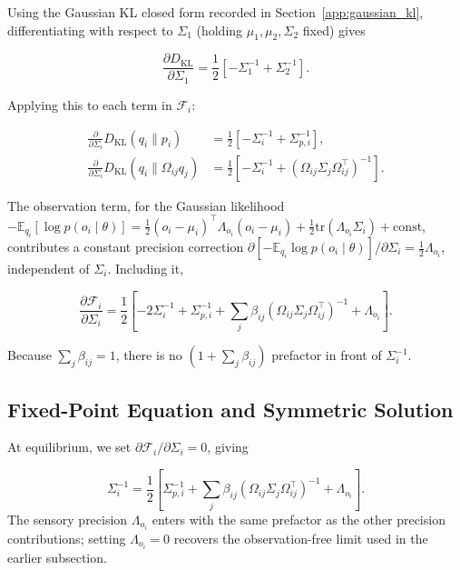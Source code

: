 \documentclass[11pt]{article}
\begin{document}
Using the Gaussian KL closed form recorded in Section~\ref{app:gaussian_kl}, differentiating with respect to $\Sigma_1$ (holding $\mu_1, \mu_2, \Sigma_2$ fixed) gives

\begin{equation}
\frac{\partial D_{\mathrm{KL}}}{\partial \Sigma_1}
=\frac{1}{2}\left[
-\Sigma_1^{-1}
+ \Sigma_2^{-1}
\right].
\end{equation}

Applying this to each term in $\mathcal{F}_i$:

\begin{align}
\frac{\partial}{\partial \Sigma_i}
D_{\mathrm{KL}}(q_i \| p_i)
&=\frac{1}{2}\left[
-\Sigma_i^{-1}
+ \Sigma_{p,i}^{-1}
\right],
\\[6pt]
\frac{\partial}{\partial \Sigma_i}
D_{\mathrm{KL}}(q_i \| \Omega_{ij} q_j)
&=
\frac{1}{2}\left[
-\Sigma_i^{-1}
+ (\Omega_{ij}\Sigma_j\Omega_{ij}^\top)^{-1}
\right].
\end{align}

The observation term, for the Gaussian likelihood $-\mathbb{E}_{q_i}[\log p(o_i \mid \theta)] = \tfrac{1}{2}(o_i - \mu_i)^\top \Lambda_{o_i}(o_i - \mu_i) + \tfrac{1}{2}\mathrm{tr}(\Lambda_{o_i}\Sigma_i) + \mathrm{const}$, contributes a constant precision correction $\partial[-\mathbb{E}_{q_i}\log p(o_i \mid \theta)]/\partial\Sigma_i = \tfrac{1}{2}\Lambda_{o_i}$, independent of $\Sigma_i$. Including it,

\begin{equation}
\boxed{
\frac{\partial \mathcal{F}_i}{\partial \Sigma_i}
=\frac{1}{2}
\left[
-2 \Sigma_i^{-1}
+ \Sigma_{p,i}^{-1}
+ \sum_j \beta_{ij}
(\Omega_{ij}\Sigma_j\Omega_{ij}^\top)^{-1}
+ \Lambda_{o_i}
\right].
}
\end{equation}

Because $\sum_j \beta_{ij} = 1$, there is no $(1 + \sum_j \beta_{ij})$ prefactor in front of $\Sigma_i^{-1}$.

\subsection{Fixed-Point Equation and Symmetric Solution}

At equilibrium, we set $\partial \mathcal{F}_i / \partial \Sigma_i = 0$, giving

\begin{equation}
\Sigma_i^{-1}
=\frac{1}{2}
\left[
\Sigma_{p,i}^{-1}
+ \sum_j \beta_{ij}
(\Omega_{ij}\Sigma_j\Omega_{ij}^\top)^{-1}
+ \Lambda_{o_i}
\right].
\label{eq:sigma_fixed_point_beta}
\end{equation}
The sensory precision $\Lambda_{o_i}$ enters with the same prefactor as the other precision contributions; setting $\Lambda_{o_i} = 0$ recovers the observation-free limit used in the earlier subsection.
\end{document}
